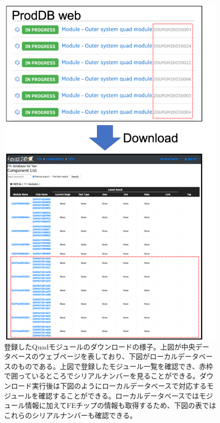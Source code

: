 \begin{figure}[bpt]\centering
\includegraphics[width=13cm]{./registerd_kek_module_viewer.png}
\caption[登録したQuadモジュールのダウンロードの様子]{登録したQuadモジュールのダウンロードの様子。上図が中央データベースのウェブページを表しており、下図がローカルデータベースのものである。上図で登録したモジュール一覧を確認でき、赤枠で囲っているところでシリアルナンバーを見ることができる。ダウンロード実行後は下図のようにローカルデータベースで対応するモジュールを確認することができる。ローカルデータベースではモジュール情報に加えてFEチップの情報も取得するため、下図の表ではこれらのシリアルナンバーも確認できる。}
\label{registered_kek_module_viewer}
\end{figure}

